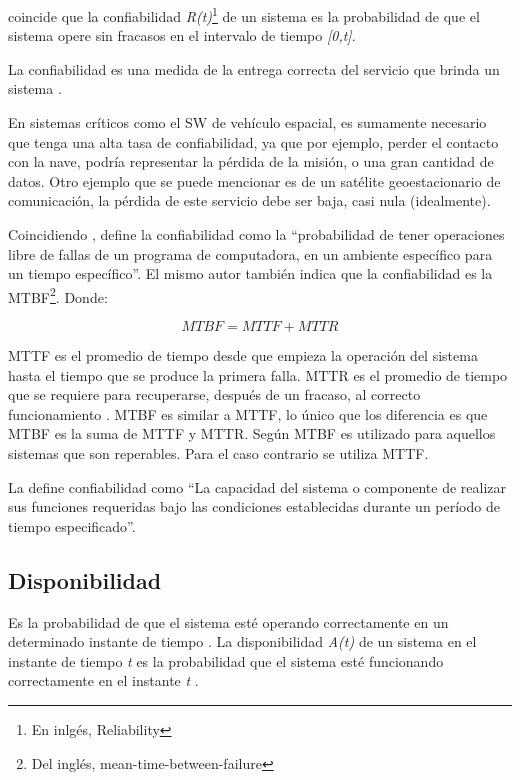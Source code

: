 \cite{FTDesign} coincide que la confiabilidad \textit{R(t)}\footnote{En inlgés, Reliability} de un 
sistema es la probabilidad de que el sistema opere sin fracasos en el intervalo de tiempo 
\textit{[0,t]}. 

La confiabilidad es una medida de la entrega correcta del servicio que brinda un sistema 
\citep{FTDesign}.

En sistemas críticos como el \ac{SW} de vehículo espacial, es sumamente necesario que tenga una 
alta tasa de confiabilidad, ya que por ejemplo, perder el contacto con la nave, podría representar 
la pérdida de la misión, o una gran cantidad de datos. Otro ejemplo que se puede mencionar es de un 
satélite geoestacionario de comunicación, la pérdida de este servicio debe ser baja, casi nula 
(idealmente). 

Coincidiendo \cite{pressman01}, define la confiabilidad como la ``probabilidad de tener operaciones 
libre de fallas de un programa de computadora, en un ambiente específico para un tiempo 
específico''. El mismo autor también indica que la confiabilidad es la \ac{MTBF}\footnote{Del 
inglés, mean-time-between-failure}. Donde:

$$MTBF = MTTF + MTTR$$

\ac{MTTF} es el promedio de tiempo desde que empieza la operación del sistema hasta el tiempo que 
se produce la primera falla. \ac{MTTR} es el promedio de tiempo que se requiere para recuperarse, 
después de un fracaso, al correcto funcionamiento \citep{Hanmer07}. \ac{MTBF}  es similar a 
\ac{MTTF}, lo único que los diferencia es que \ac{MTBF} es la suma de \ac{MTTF} y \ac{MTTR}. Según 
\cite{Hanmer07} \ac{MTBF} es utilizado para aquellos sistemas que son reperables. Para el caso 
contrario se utiliza \ac{MTTF}. 

La \cite{IEEE610.12} define confiabilidad como ``La capacidad del sistema o componente de realizar 
sus funciones requeridas bajo las condiciones establecidas durante un período de tiempo 
especificado''. 

\subsection{Disponibilidad}
Es la probabilidad de que el sistema esté operando correctamente en un determinado instante de 
tiempo \citep{SoftwareFaultToleranceATutorial}. La disponibilidad \textit{A(t)} de un sistema en el 
instante de tiempo \textit{t} es la probabilidad que el sistema esté funcionando correctamente en 
el instante \textit{t} \citep{FTDesign}. 

